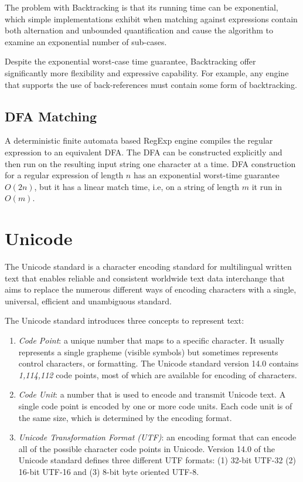 The problem with Backtracking is that its running time can be exponential, which simple implementations exhibit when matching against expressions contain both alternation and unbounded quantification and cause the algorithm to examine an exponential number of sub-cases.

Despite the exponential worst-case time guarantee, Backtracking offer significantly more flexibility and expressive capability. For example, any engine that supports the use of back-references must contain some form of backtracking.

\subsection{DFA Matching}

A deterministic finite automata based RegExp engine compiles the regular expression to an equivalent DFA. The DFA can be constructed explicitly and then run on the resulting input string one character at a time. DFA construction for a regular expression of length $n$ has an exponential worst-time guarantee $O(2n)$, but it has a linear match time, i.e, on a string of length $m$ it run in $O(m)$.


\section{Unicode}
The Unicode standard \cite{unicode} is a character encoding standard for multilingual written text that enables reliable and consistent worldwide text data interchange that aims to replace the numerous different ways of encoding characters with a single, universal, efficient and unambiguous standard.

The Unicode standard introduces three concepts to represent text:
\begin{enumerate}
    \item \textit{Code Point}: a unique number that maps to a specific character. It usually represents a single grapheme (visible symbols) but sometimes represents control characters, or formatting. The Unicode standard version 14.0 contains \textit{1,114,112} code points, most of which are available for encoding of characters.
    
    \item \textit{Code Unit}: a number that is used to encode and transmit Unicode text. A single code point is encoded by one or more code units. Each code unit is of the same size, which is determined by the encoding format.
    
    \item \textit{Unicode Transformation Format (UTF)}: an encoding format that can encode all of the possible character code points in Unicode. Version 14.0 of the Unicode standard defines three different UTF formats: (1) 32-bit UTF-32 (2) 16-bit UTF-16 and (3) 8-bit byte oriented UTF-8.
\end{enumerate}

